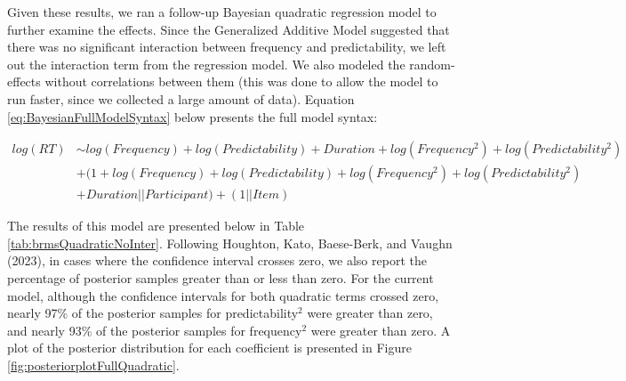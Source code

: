 \documentclass[
  man,floatsintext]{apa6}
\begin{document}
Given these results, we ran a follow-up Bayesian quadratic regression model to further examine the effects. Since the Generalized Additive Model suggested that there was no significant interaction between frequency and predictability, we left out the interaction term from the regression model. We also modeled the random-effects without correlations between them (this was done to allow the model to run faster, since we collected a large amount of data). Equation \eqref{eq:BayesianFullModelSyntax} below presents the full model syntax:

\begin{equation}
\begin{aligned}
\label{eq:BayesianFullModelSyntax}
log(RT) & \sim  log(Frequency) + log(Predictability) + Duration + log(Frequency^2)  
+ log(Predictability^2) \\ 
& + (1 + log(Frequency) + log(Predictability) + log(Frequency^2) + log(Predictability^2) \\
& + Duration || Participant) + (1 || Item)
\end{aligned}
\end{equation}

The results of this model are presented below in Table \ref{tab:brmsQuadraticNoInter}. Following Houghton, Kato, Baese-Berk, and Vaughn (2023), in cases where the confidence interval crosses zero, we also report the percentage of posterior samples greater than or less than zero. For the current model, although the confidence intervals for both quadratic terms crossed zero, nearly 97\% of the posterior samples for predictability\(^2\) were greater than zero, and nearly 93\% of the posterior samples for frequency\(^2\) were greater than zero. A plot of the posterior distribution for each coefficient is presented in Figure \ref{fig:posteriorplotFullQuadratic}.
\end{document}
